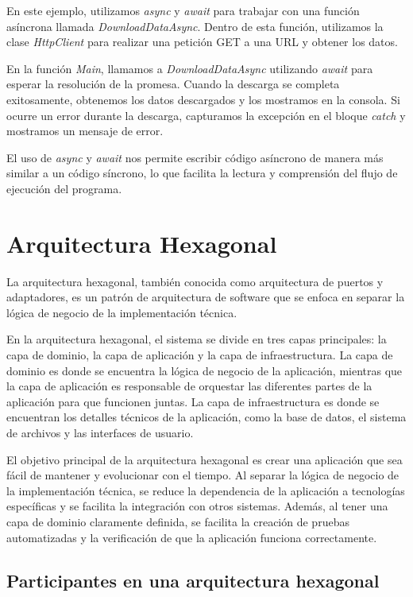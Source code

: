 \documentclass[executivepaper]{article}
\begin{document}
En este ejemplo, utilizamos \emph{async} y \emph{await} para trabajar con una función asíncrona llamada \emph{DownloadDataAsync}. Dentro de esta función, utilizamos la clase \emph{HttpClient} para realizar una petición GET a una URL y obtener los datos.

En la función \emph{Main}, llamamos a \emph{DownloadDataAsync} utilizando \emph{await} para esperar la resolución de la promesa. Cuando la descarga se completa exitosamente, obtenemos los datos descargados y los mostramos en la consola. Si ocurre un error durante la descarga, capturamos la excepción en el bloque \emph{catch} y mostramos un mensaje de error.

El uso de \emph{async} y \emph{await} nos permite escribir código asíncrono de manera más similar a un código síncrono, lo que facilita la lectura y comprensión del flujo de ejecución del programa.

\section{Arquitectura Hexagonal}

La arquitectura hexagonal, también conocida como arquitectura de puertos y adaptadores, es un patrón de arquitectura de software que se enfoca en separar la lógica de negocio de la implementación técnica.

En la arquitectura hexagonal, el sistema se divide en tres capas principales: la capa de dominio, la capa de aplicación y la capa de infraestructura. La capa de dominio es donde se encuentra la lógica de negocio de la aplicación, mientras que la capa de aplicación es responsable de orquestar las diferentes partes de la aplicación para que funcionen juntas. La capa de infraestructura es donde se encuentran los detalles técnicos de la aplicación, como la base de datos, el sistema de archivos y las interfaces de usuario.

El objetivo principal de la arquitectura hexagonal es crear una aplicación que sea fácil de mantener y evolucionar con el tiempo. Al separar la lógica de negocio de la implementación técnica, se reduce la dependencia de la aplicación a tecnologías específicas y se facilita la integración con otros sistemas. Además, al tener una capa de dominio claramente definida, se facilita la creación de pruebas automatizadas y la verificación de que la aplicación funciona correctamente.

\subsection{Participantes en una arquitectura hexagonal}
\end{document}
